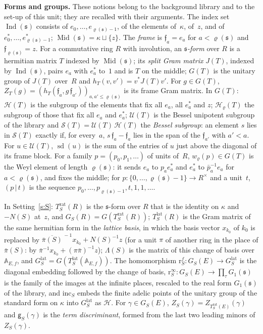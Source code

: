 \documentclass[11pt,a4paper]{article}
\newcommand{\m}[1]{\mbox{$#1$}}        %
\newcommand{\subhead}[1]{\par\addvspace{9pt plus 2pt}\Needspace{4\baselineskip}\noindent\textbf{#1}\enspace\ignorespaces}
\theoremstyle{plainx}
\theoremstyle{uprightx}
\newcommand{\fs}{\mathfrak{s}}                      %
\newcommand{\AEf}{\mathbb{A}_{E,f}}
\newcommand{\rh}[1]{\varrho(#1)}                    %
\newcommand{\Ix}[1]{\operatorname{Ind}(#1)}                          %
\newcommand{\Mx}[1]{\operatorname{Mid}(#1)}                          %
\newcommand{\NS}[1]{N(#1)}                          %
\newcommand{\piS}[1]{\bar\pi(#1)}                   %
\newcommand{\Trat}[2]{T^{\mathrm{rat}}_{#1}(#2)}    %
\newcommand{\Tlat}[2]{T^{\mathrm{lat}}_{#1}(#2)}    %
\newcommand{\GS}[2]{G_{#1}(#2)}                     %
\newcommand{\GFin}[1]{G^{\mathrm{lat}}_{#1}}        %
\newcommand{\latB}[1]{\Lambda(#1)}                  %
\newcommand{\rinf}[1]{\mathrm{r}^{\infty}_{#1}}     %
\newcommand{\rfin}[1]{\mathrm{r}^{f}_{#1}}          %
\newcommand{\incH}[1]{\mathrm{inc}_{#1}}            %
\newcommand{\Zf}[2]{Z_{#1}(#2)}                     %
\newcommand{\tdisc}[2]{\mathsf{g}_{#1}(#2)}         %
\newcommand{\weyl}[2]{w_{#1}(#2)}                   %
\newcommand{\pad}[2]{(#1\,|\,#2)}                   %
\begin{document}
\subhead{Forms and groups.} These notions belong to the background library and to the set-up of this unit;
they are recalled with their arguments. The index set \m{\Ix{\fs}} consists of \m{e_0,\dots,e_{\rh{\fs}-1}}, of
the elements of~$\kappa$, of~$z$, and of \m{e^*_0,\dots,e^*_{\rh{\fs}-1}}; \m{\Mx{\fs}=\kappa\sqcup\{z\}}. The
\emph{frame} is \m{\mathfrak f_a=e_a} for \m{a<\rh{\fs}} and \m{\mathfrak f_{\rh{\fs}}=z}. For a commutative ring
$R$ with involution, an \emph{$\fs$-form} over $R$ is a hermitian matrix $T$ indexed by \m{\Mx{\fs}}; its
\emph{split Gram matrix} $J(T)$, indexed by \m{\Ix{\fs}}, pairs $e_a$ with $e^*_a$ to~$1$ and is $T$ on the
middle; \m{G(T)} is the unitary group of $J(T)$ over~$R$ and \m{h_T(v,v')=v^*J(T)v'}. For \m{g\in G(T)},
\m{Z_T(g)=(h_T(\mathfrak f_a,g\,\mathfrak f_{a'}))_{a,a'\le\rh{\fs}}} is its frame Gram matrix. In \m{G(T)}:
\m{\mathcal H(T)} is the subgroup of the elements that fix all $e_a$, all $e^*_a$ and $z$; \m{\mathcal H_\varrho(T)}
the subgroup of those that fix all $e_a$ and $e^*_a$; \m{\mathcal U(T)} is the Bessel unipotent subgroup of the
library and \m{\mathcal S(T)=\mathcal U(T)\,\mathcal H(T)} the \emph{Bessel subgroup}: an element $s$ lies in
\m{\mathcal S(T)} exactly if, for every~$a$, \m{s\,\mathfrak f_a-\mathfrak f_a} lies in the span of the
\m{\mathfrak f_{a'}} with \m{a'<a}. For \m{u\in\mathcal U(T)}, \m{\operatorname{sd}(u)} is the sum of the entries
of $u$ just above the diagonal of its frame block. For a family \m{p=(p_0,p_1,\dots)} of units of~$R$,
\m{\weyl{\varrho}{p}\in G(T)} is the Weyl element of length \m{\rh{\fs}}: it sends $e_a$ to \m{p_a e^*_a} and
$e^*_a$ to \m{\bar p_a^{-1}e_a} for \m{a<\rh{\fs}}, and fixes the middle; for \m{p\colon\{0,\dots,\rh{\fs}-1\}\to
R^\times} and a unit~$t$, \m{\pad{p}{t}} is the sequence \m{p_0,\dots,p_{\rh{\fs}-1},t,1,1,\dots}.

In Setting~\ref{s:S}: \m{\Trat{S}{R}} is the $\fs$-form over $R$ that is the identity on $\kappa$ and
\m{-\NS{S}} at~$z$, and \m{\GS{S}{R}=G(\Trat{S}{R})}; \m{\Tlat{S}{R}} is the Gram matrix of the same hermitian
form in the \emph{lattice basis}, in which the basis vector \m{x_{k_0}} of $k_0$ is replaced by
\m{\overline{\piS{S}}^{\,-1}x_{k_0}+\NS{S}^{-1}z} (for a unit $\pi$ of another ring in the place of \m{\piS{S}}: by
\m{\bar\pi^{-1}x_{k_0}+(\pi\bar\pi)^{-1}z}); \m{\latB{S}} is the matrix of this change of basis over
\m{\AEf}, and \m{\GFin{S}=G(\Tlat{S}{\AEf})}. The homomorphism \m{\rfin{S}\colon\GS{S}{E}\to\GFin{S}} is the
diagonal embedding followed by the change of basis, \m{\rinf{S}\colon\GS{S}{E}\to\prod_\tau G_1(\fs)} is the
family of the images at the infinite places, rescaled to the real form \m{G_1(\fs)} of the library, and
\m{\incH{S}} embeds the finite adelic points of the unitary group of the standard form on $\kappa$ into
\m{\GFin{S}} as \m{\mathcal H}. For \m{\gamma\in\GS{S}{E}}, \m{\Zf{S}{\gamma}=Z_{\Trat{S}{E}}(\gamma)} and
\m{\tdisc{S}{\gamma}} is the \emph{term discriminant}, formed from the last two leading minors of
\m{\Zf{S}{\gamma}}.
\end{document}
